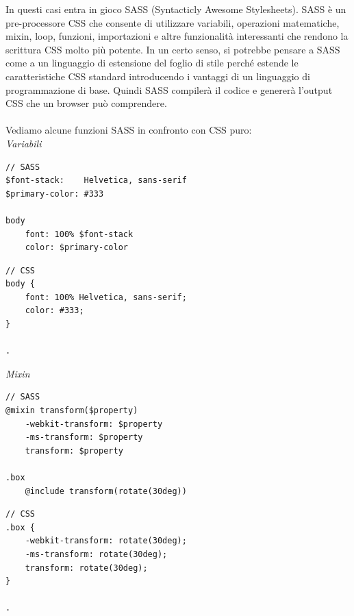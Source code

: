 In questi casi entra in gioco SASS (Syntacticly Awesome Stylesheets).
SASS è un pre-processore CSS che consente di utilizzare variabili, operazioni matematiche, mixin, loop, funzioni, importazioni 
e altre funzionalità interessanti che rendono la scrittura CSS molto più potente. In un certo senso, si potrebbe pensare a 
SASS come a un linguaggio di estensione del foglio di stile perché estende le caratteristiche CSS standard introducendo i
vantaggi di un linguaggio di programmazione di base. Quindi SASS compilerà il codice e genererà l'output CSS che un
browser può comprendere.

\paragraph{}
\paragraph{}
\paragraph{}
\paragraph{}

Vediamo alcune funzioni SASS in confronto con CSS puro:\\

\textit{Variabili}
\begin{multicols}{2}
    \begin{lstlisting}
// SASS
$font-stack:    Helvetica, sans-serif
$primary-color: #333

body
    font: 100% $font-stack
    color: $primary-color
    \end{lstlisting}
    \columnbreak
    \begin{lstlisting}
// CSS
body {
    font: 100% Helvetica, sans-serif;
    color: #333;
} 

.
    \end{lstlisting}
\end{multicols}

\begin{multicols}{2}
    \columnbreak
\end{multicols}


\textit{Mixin}

\begin{multicols}{2}
    \begin{lstlisting}
// SASS
@mixin transform($property) 
    -webkit-transform: $property
    -ms-transform: $property
    transform: $property

.box
    @include transform(rotate(30deg))   
    \end{lstlisting}
    \columnbreak
    \begin{lstlisting}
// CSS
.box {
    -webkit-transform: rotate(30deg);
    -ms-transform: rotate(30deg);
    transform: rotate(30deg);
}

.
    \end{lstlisting}
\end{multicols}

